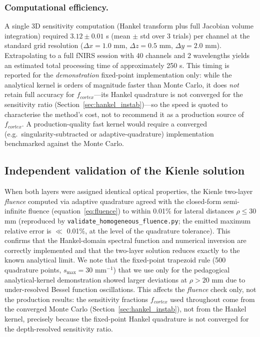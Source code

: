 \documentclass[11pt]{article}
\def\mathrm#1{#1}%
\def\,{ }%
\begin{document}
\subsubsection{Computational efficiency.}
A single 3D sensitivity computation (Hankel transform plus full Jacobian volume integration) required $3.12 \pm 0.01$\,s (mean $\pm$ std over 3 trials) per channel at the standard grid resolution ($\Delta x = 1.0$\,mm, $\Delta z = 0.5$\,mm, $\Delta y = 2.0$\,mm). Extrapolating to a full fNIRS session with 40 channels and 2 wavelengths yields an estimated total processing time of approximately 250\,s. This timing is reported for the \emph{demonstration} fixed-point implementation only: while the analytical kernel is orders of magnitude faster than Monte Carlo, it does \emph{not} retain full accuracy for $f_{\mathrm{cortex}}$---its Hankel quadrature is not converged for the sensitivity ratio (Section~\ref{sec:hankel_instab})---so the speed is quoted to characterise the method's cost, not to recommend it as a production source of $f_{\mathrm{cortex}}$. A production-quality fast kernel would require a converged (e.g.\ singularity-subtracted or adaptive-quadrature) implementation benchmarked against the Monte Carlo.

\subsection{Independent validation of the Kienle solution}
\label{sec:validation_results}

When both layers were assigned identical optical properties, the Kienle two-layer \emph{fluence} computed via adaptive quadrature agreed with the closed-form semi-infinite fluence (equation~\ref{eq:fluence}) to within 0.01\% for lateral distances $\rho \leq 30$\,mm (reproduced by \texttt{validate\_homogeneous\_fluence.py}; the emitted maximum relative error is $\ll$\,0.01\%, at the level of the quadrature tolerance). This confirms that the Hankel-domain spectral function and numerical inversion are correctly implemented and that the two-layer solution reduces exactly to the known analytical limit. We note that the fixed-point trapezoid rule (500 quadrature points, $s_{\max} = 30$\,mm$^{-1}$) that we use only for the pedagogical analytical-kernel demonstration showed larger deviations at $\rho > 20$\,mm due to under-resolved Bessel function oscillations. This affects the \emph{fluence} check only, not the production results: the sensitivity fractions $f_{\mathrm{cortex}}$ used throughout come from the converged Monte Carlo (Section~\ref{sec:hankel_instab}), not from the Hankel kernel, precisely because the fixed-point Hankel quadrature is not converged for the depth-resolved sensitivity ratio.
\end{document}
